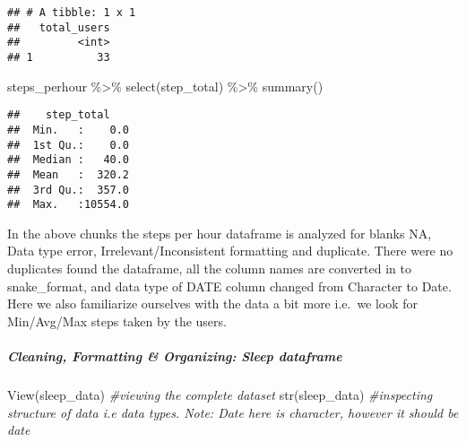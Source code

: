 \documentclass[
]{article}
\newenvironment{Shaded}{\begin{snugshade}}{\end{snugshade}}
\newcommand{\AttributeTok}[1]{\textcolor[rgb]{0.77,0.63,0.00}{#1}}
\newcommand{\CommentTok}[1]{\textcolor[rgb]{0.56,0.35,0.01}{\textit{#1}}}
\newcommand{\FunctionTok}[1]{\textcolor[rgb]{0.00,0.00,0.00}{#1}}
\newcommand{\NormalTok}[1]{#1}
\newcommand{\SpecialCharTok}[1]{\textcolor[rgb]{0.00,0.00,0.00}{#1}}
\begin{document}
\begin{Shaded}
\end{Shaded}

\begin{verbatim}
## # A tibble: 1 x 1
##   total_users
##         <int>
## 1          33
\end{verbatim}

\begin{Shaded}
\begin{Highlighting}[]
\NormalTok{steps\_perhour }\SpecialCharTok{\%\textgreater{}\%}
\FunctionTok{select}\NormalTok{(step\_total) }\SpecialCharTok{\%\textgreater{}\%}
\FunctionTok{summary}\NormalTok{()}
\end{Highlighting}
\end{Shaded}

\begin{verbatim}
##    step_total     
##  Min.   :    0.0  
##  1st Qu.:    0.0  
##  Median :   40.0  
##  Mean   :  320.2  
##  3rd Qu.:  357.0  
##  Max.   :10554.0
\end{verbatim}

In the above chunks the steps per hour dataframe is analyzed for blanks
NA, Data type error, Irrelevant/Inconsistent formatting and duplicate.
There were no duplicates found the dataframe, all the column names are
converted in to snake\_format, and data type of DATE column changed from
Character to Date. Here we also familiarize ourselves with the data a
bit more i.e.~we look for Min/Avg/Max steps taken by the users.

\hypertarget{cleaning-formatting-organizing-sleep-dataframe}{%
\subparagraph{\texorpdfstring{\textbf{Cleaning, Formatting \&
Organizing: Sleep
dataframe}}{Cleaning, Formatting \& Organizing: Sleep dataframe}}\label{cleaning-formatting-organizing-sleep-dataframe}}

\begin{Shaded}
\begin{Highlighting}[]
 \FunctionTok{View}\NormalTok{(sleep\_data) }\CommentTok{\#viewing the complete dataset}
 \FunctionTok{str}\NormalTok{(sleep\_data) }\CommentTok{\#inspecting structure of data i.e data types. Note: Date here is character, however it should be date}
\end{Highlighting}
\end{Shaded}
\end{document}
